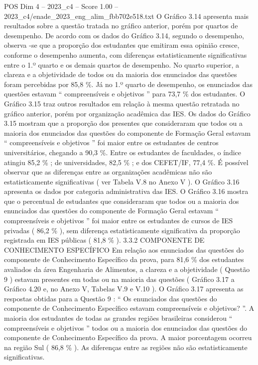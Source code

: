 \begin{textsample}{POS Dim 4 – 2023\_c4 – Score 1.00 – 2023\_c4/enade\_2023\_eng\_alim\_fbb702e518.txt}
O Gráfico 3.14 apresenta mais resultados sobre a questão tratada no gráfico anterior, porém por quartos de desempenho.
De acordo com os dados do Gráfico 3.14, segundo o desempenho, observa -se que a proporção dos estudantes que emitiram essa opinião cresce, conforme o desempenho aumenta, com diferenças estatisticamente significativas entre o 1.º quarto e os demais quartos de desempenho.
No quarto superior, a clareza e a objetividade de todos ou da maioria dos enunciados das questões foram percebidas por 85,8 \%.
Já no 1.º quarto de desempenho, os enunciados das questões estavam “ compreensíveis e objetivos ” para 73,7 \% dos estudantes.
O Gráfico 3.15 traz outros resultados em relação à mesma questão retratada no gráfico anterior, porém por organização acadêmica das IES.
Os dados do Gráfico 3.15 mostram que a proporção dos presentes que consideraram que todos ou a maioria dos enunciados das questões do componente de Formação Geral estavam “ compreensíveis e objetivos ” foi maior entre os estudantes de centros universitários, chegando a 90,3 \%.
Entre os estudantes de faculdades, o índice atingiu 85,2 \% ; de universidades, 82,5 \% ; e dos CEFET/IF, 77,4 \%.
É possível observar que as diferenças entre as organizações acadêmicas não são estatisticamente significativas ( ver Tabela V.8 no Anexo V ).
O Gráfico 3.16 apresenta os dados por categoria administrativa das IES.
O Gráfico 3.16 mostra que o percentual de estudantes que consideraram que todos ou a maioria dos enunciados das questões do componente de Formação Geral estavam “ compreensíveis e objetivos ” foi maior entre os estudantes de cursos de IES privadas ( 86,2 \% ), sem diferença estatisticamente significativa da proporção registrada em IES públicas ( 81,8 \% ). 3.3.2 COMPONENTE DE CONHECIMENTO ESPECÍFICO Em relação aos enunciados das questões do componente de Conhecimento Específico da prova, para 81,6 \% dos estudantes avaliados da área Engenharia de Alimentos, a clareza e a objetividade ( Questão 9 ) estavam presentes em todas ou na maioria das questões ( Gráfico 3.17 a Gráfico 4.20 e, no Anexo V, Tabelas V.9 e V.10 ).
O Gráfico 3.17 apresenta as respostas obtidas para a Questão 9 : “ Os enunciados das questões do componente de Conhecimento Específico estavam compreensíveis e objetivos? ”.
A maioria dos estudantes de todas as grandes regiões brasileiras considerou “ compreensíveis e objetivos ” todos ou a maioria dos enunciados das questões do componente de Conhecimento Específico da prova.
A maior porcentagem ocorreu na região Sul ( 86,8 \% ).
As diferenças entre as regiões não são estatisticamente significativas.

\end{textsample}

